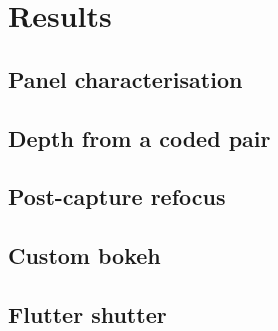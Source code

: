 %
\section{Results}\label{sec:results}

\subsection{Panel characterisation}\label{sec:res-panel}

\subsection{Depth from a coded pair}\label{sec:res-depth}

\subsection{Post-capture refocus}\label{sec:res-refocus}

\subsection{Custom bokeh}\label{sec:res-bokeh}

\subsection{Flutter shutter}\label{sec:res-flutter}
